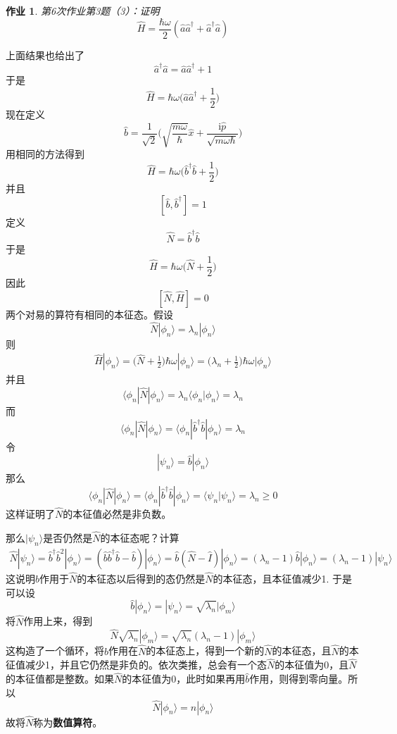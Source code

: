 \documentclass[12pt]{article}
\newtheorem{asg}{作业}
\begin{document}
    \begin{asg}
        第6次作业第3题（3）：证明
        \[ \hat{H} = \frac {\hbar \omega}2 (\hat{a}\hat{a}^\dagger + \hat{a}^\dagger \hat{a}) \]
    \end{asg}
    上面结果也给出了
    \[ \hat{a}^\dagger\hat{a} = \hat{a}\hat{a}^\dagger + 1 \]
    于是
    \[ \hat{H} = \hbar \omega\bigg(\hat{a}\hat{a}^\dagger + \frac 12\bigg)\]
    现在定义
    \[ \hat{b} = \frac 1{\sqrt{2}}\bigg(\sqrt{\frac {m\omega}{\hbar}}\hat{x} + \frac {\mathrm{i}\hat{p}}{\sqrt{m\omega\hbar}}\bigg) \]
    用相同的方法得到 
    \[ \hat{H} = \hbar \omega\bigg(\hat{b}^\dagger\hat{b}+ \frac 12\bigg) \]
    并且
    \[ [\hat{b}, \hat{b}^\dagger] = 1 \]
    定义
    \[ \hat{N} = \hat{b}^\dagger\hat{b} \]
    于是
    \[ \hat{H} = \hbar \omega \bigg(\hat{N}+\frac 12\bigg) \]
    因此 
    \[ [\hat{N},\hat{H}] = 0 \]
    两个对易的算符有相同的本征态。假设
    \[ \hat{N}|\phi_n \rangle = \lambda_n |\phi_n \rangle \]
    则
    \begin{align*}
        \hat{H}|\phi_n \rangle = \bigg(\hat{N}+\frac 12\bigg)\hbar\omega|\phi_n \rangle = \bigg(\lambda_n + \frac 12\bigg)\hbar\omega|\phi_n\rangle
    \end{align*}
    并且
    \[ \langle \phi_n|\hat{N}|\phi_n \rangle = \lambda_n \langle \phi_n |\phi_n \rangle = \lambda_n \]
    而
    \[ \langle \phi_n|\hat{N}|\phi_n \rangle =  \langle \phi_n |\hat{b}^\dagger\hat{b}|\phi_n \rangle = \lambda_n \]
    令
    \[ |\psi_n \rangle = \hat{b}|\phi_n\rangle \]
    那么
    \[ \langle \phi_n|\hat{N}|\phi_n \rangle =  \langle \phi_n |\hat{b}^\dagger\hat{b}|\phi_n \rangle = \langle \psi_n|\psi_n \rangle = \lambda_n \geqslant 0 \]
    这样证明了$\hat{N}$的本征值必然是非负数。

    那么$|\psi_n\rangle$是否仍然是$\hat{N}$的本征态呢？计算
    \begin{align*}
        \hat{N}|\psi_n\rangle = \hat{b}^\dagger\hat{b}^2|\phi_n\rangle = (\hat{b}\hat{b}^\dagger\hat{b}- \hat{b})|\phi_n\rangle = \hat{b}(\hat{N}-\hat{I})|\phi_n\rangle = (\lambda_n-1)\hat{b}|\phi_n\rangle = (\lambda_n - 1)|\psi_n\rangle
    \end{align*}
    这说明$\hat{b}$作用于$\hat{N}$的本征态以后得到的态仍然是$\hat{N}$的本征态，且本征值减少1. 于是可以设
    \[ \hat{b}|\phi_n\rangle = |\psi_n\rangle = \sqrt{\lambda_n}|\phi_m\rangle \]
    将$\hat{N}$作用上来，得到
    \[ \hat{N}\sqrt{\lambda_n}|\phi_m \rangle = \sqrt{\lambda_n}(\lambda_n-1)|\phi_m\rangle \]
    这构造了一个循环，将$\hat{b}$作用在$\hat{N}$的本征态上，得到一个新的$\hat{N}$的本征态，且$\hat{N}$的本征值减少1，并且它仍然是非负的。依次类推，总会有一个态$\hat{N}$的本征值为0，且$\hat{N}$的本征值都是整数。如果$\hat{N}$的本征值为0，此时如果再用$\hat{b}$作用，则得到零向量。所以
    \[ \hat{N}|\phi_n \rangle = n|\phi_n\rangle \]
    故将$\hat{N}$称为\textbf{数值算符}。
\end{document}
